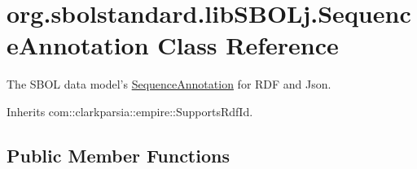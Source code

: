 \hypertarget{classorg_1_1sbolstandard_1_1lib_s_b_o_lj_1_1_sequence_annotation}{
\section{org.sbolstandard.libSBOLj.SequenceAnnotation Class Reference}
\label{classorg_1_1sbolstandard_1_1lib_s_b_o_lj_1_1_sequence_annotation}
}


The SBOL data model's \hyperlink{classorg_1_1sbolstandard_1_1lib_s_b_o_lj_1_1_sequence_annotation}{SequenceAnnotation} for RDF and Json.  




Inherits com::clarkparsia::empire::SupportsRdfId.

\subsection*{Public Member Functions}
